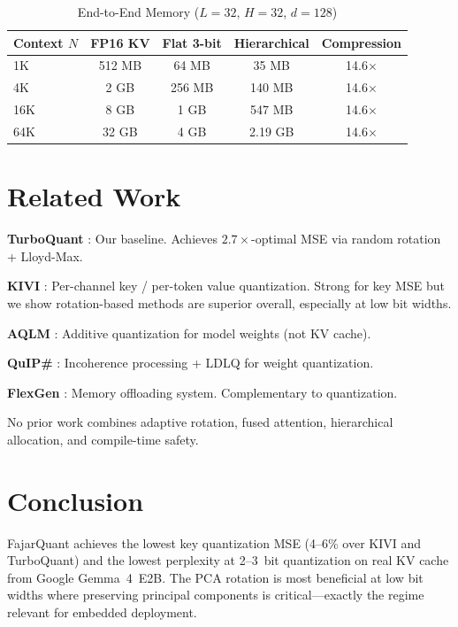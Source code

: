 \documentclass[10pt,twocolumn]{article}
\begin{document}
\begin{table}[h]
\centering
\caption{End-to-End Memory ($L{=}32$, $H{=}32$, $d{=}128$)}
\label{tab:memory_e2e}
\begin{tabular}{lcccc}
\toprule
Context $N$ & FP16 KV & Flat 3-bit & Hierarchical & Compression \\
\midrule
1K & 512 MB & 64 MB & 35 MB & 14.6$\times$ \\
4K & 2 GB & 256 MB & 140 MB & 14.6$\times$ \\
16K & 8 GB & 1 GB & 547 MB & 14.6$\times$ \\
64K & 32 GB & 4 GB & 2.19 GB & 14.6$\times$ \\
\bottomrule
\end{tabular}
\end{table}

\section{Related Work}

\textbf{TurboQuant} \citep{zandieh2025turboquant}: Our baseline. Achieves $2.7\times$-optimal MSE via random rotation + Lloyd-Max.

\textbf{KIVI} \citep{liu2024kivi}: Per-channel key / per-token value quantization. Strong for key MSE but we show rotation-based methods are superior overall, especially at low bit widths.

\textbf{AQLM} \citep{egiazarian2024aqlm}: Additive quantization for model weights (not KV cache).

\textbf{QuIP\#} \citep{tseng2024quip}: Incoherence processing + LDLQ for weight quantization.

\textbf{FlexGen} \citep{sheng2023flexgen}: Memory offloading system. Complementary to quantization.

No prior work combines adaptive rotation, fused attention, hierarchical allocation, and compile-time safety.

\section{Conclusion}

FajarQuant achieves the lowest key quantization MSE (4--6\% over KIVI and TurboQuant) and the lowest perplexity at 2--3~bit quantization on real KV cache from Google Gemma~4~E2B. The PCA rotation is most beneficial at low bit widths where preserving principal components is critical---exactly the regime relevant for embedded deployment.
\end{document}
